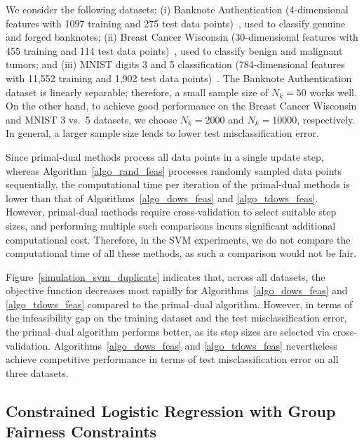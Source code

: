 \documentclass{article}
\theoremstyle{plain}
\theoremstyle{definition}
\theoremstyle{remark}
\begin{document}
We consider the following datasets: (i) Banknote Authentication (4-dimensional features with 1097 training and 275 test data points)~\cite{banknote_authentication_267}, used to classify genuine and forged banknotes; (ii) Breast Cancer Wisconsin (30-dimensional features with 455 training and 114 test data points)~\cite{breast_cancer_wisconsin_diagnostic_1993}, used to classify benign and malignant tumors; and (iii) MNIST digits 3 and 5 classification (784-dimensional features with 11{,}552 training and 1{,}902 test data points)~\cite{lecun2010mnist}. The Banknote Authentication dataset is linearly separable; therefore, a small sample size of $N_k = 50$ works well. On the other hand, to achieve good performance on the Breast Cancer Wisconsin and MNIST 3 vs.\ 5 datasets, we choose $N_k = 2000$ and $N_k = 10000$, respectively. In general, a larger sample size leads to lower test misclassification error.

Since primal-dual methods process all data points in a single update step, whereas Algorithm~\ref{algo_rand_feas} processes randomly sampled data points sequentially, the computational time per iteration of the primal-dual methods is lower than that of Algorithms~\ref{algo_dows_feas} and \ref{algo_tdows_feas}. However, primal-dual methods require cross-validation to select suitable step sizes, and performing multiple such comparisons incurs significant additional computational cost. Therefore, in the SVM experiments, we do not compare the computational time of all these methods, as such a comparison would not be fair.



Figure~\ref{simulation_svm_duplicate} indicates that, across all datasets, the objective function decreases most rapidly for Algorithms~\ref{algo_dows_feas} and \ref{algo_tdows_feas} compared to the primal–dual algorithm. However, in terms of the infeasibility gap on the training dataset and the test misclassification error, the primal–dual algorithm performs better, as its step sizes are selected via cross-validation. Algorithms~\ref{algo_dows_feas} and \ref{algo_tdows_feas} nevertheless achieve competitive performance in terms of test misclassification error on all three datasets.


\subsection{Constrained Logistic Regression with Group Fairness Constraints}\label{app_fairness_simulation}
\end{document}
